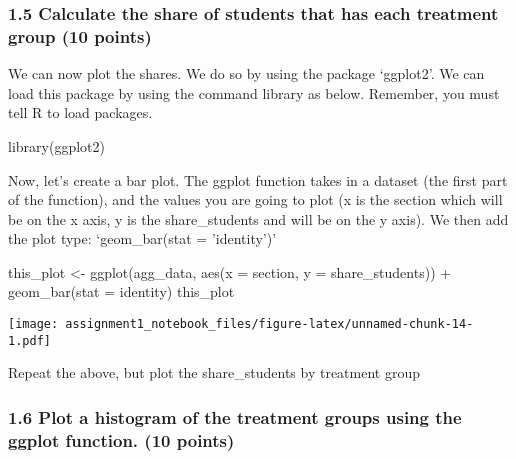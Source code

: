 \documentclass[
]{article}
\newenvironment{Shaded}{\begin{snugshade}}{\end{snugshade}}
\newcommand{\AttributeTok}[1]{\textcolor[rgb]{0.77,0.63,0.00}{#1}}
\newcommand{\FunctionTok}[1]{\textcolor[rgb]{0.00,0.00,0.00}{#1}}
\newcommand{\NormalTok}[1]{#1}
\newcommand{\OtherTok}[1]{\textcolor[rgb]{0.56,0.35,0.01}{#1}}
\newcommand{\SpecialCharTok}[1]{\textcolor[rgb]{0.00,0.00,0.00}{#1}}
\newcommand{\StringTok}[1]{\textcolor[rgb]{0.31,0.60,0.02}{#1}}
\begin{document}
\hypertarget{calculate-the-share-of-students-that-has-each-treatment-group-10-points}{%
\subsubsection{1.5 Calculate the share of students that has each
treatment group (10
points)}\label{calculate-the-share-of-students-that-has-each-treatment-group-10-points}}

We can now plot the shares. We do so by using the package `ggplot2'. We
can load this package by using the command library as below. Remember,
you must tell R to load packages.

\begin{Shaded}
\begin{Highlighting}[]
\FunctionTok{library}\NormalTok{(ggplot2)}
\end{Highlighting}
\end{Shaded}

Now, let's create a bar plot. The ggplot function takes in a dataset
(the first part of the function), and the values you are going to plot
(x is the section which will be on the x axis, y is the share\_students
and will be on the y axis). We then add the plot type: `geom\_bar(stat =
'identity')'

\begin{Shaded}
\begin{Highlighting}[]
\NormalTok{this\_plot }\OtherTok{\textless{}{-}} \FunctionTok{ggplot}\NormalTok{(agg\_data, }\FunctionTok{aes}\NormalTok{(}\AttributeTok{x =}\NormalTok{ section, }\AttributeTok{y =}\NormalTok{ share\_students)) }\SpecialCharTok{+} \FunctionTok{geom\_bar}\NormalTok{(}\AttributeTok{stat =} \StringTok{\textquotesingle{}identity\textquotesingle{}}\NormalTok{)}
\NormalTok{this\_plot}
\end{Highlighting}
\end{Shaded}

\texttt{[image: assignment1\_notebook\_files/figure-latex/unnamed-chunk-14-1.pdf]}

Repeat the above, but plot the share\_students by treatment group

\hypertarget{plot-a-histogram-of-the-treatment-groups-using-the-ggplot-function.-10-points}{%
\subsubsection{1.6 Plot a histogram of the treatment groups using the
ggplot function. (10
points)}\label{plot-a-histogram-of-the-treatment-groups-using-the-ggplot-function.-10-points}}
\end{document}

